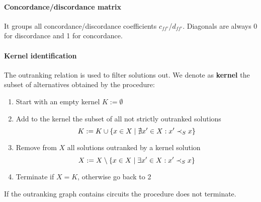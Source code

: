 \paragraph{Concordance/discordance matrix} It groups all concordance/discordance coefficients $c_{ff'}$/$d_{ff'}$. Diagonals are always 0 for discordance and 1 for concordance.

\paragraph{Kernel identification} The outranking relation is used to filter solutions out. We denote as \textbf{kernel} the subset of alternatives obtained by the procedure: 
\begin{enumerate}
	\item Start with an empty kernel $K := \emptyset$ 
	
	\item Add to the kernel the subset of all not strictly outranked solutions
	$$ K := K \cup \left\{x \in X \mid \nexists x' \in X : x' \prec_{S} x \right\} $$
	
	\item Remove from $X$ all solutions outranked by a kernel solution
	$$ X := X \setminus \left\{x \in X \mid \exists x' \in X : x' \prec_{S} x \right\} $$
	
	\item Terminate if $X = K$, otherwise go back to 2
\end{enumerate}

If the outranking graph contains circuits the procedure does not terminate. 

